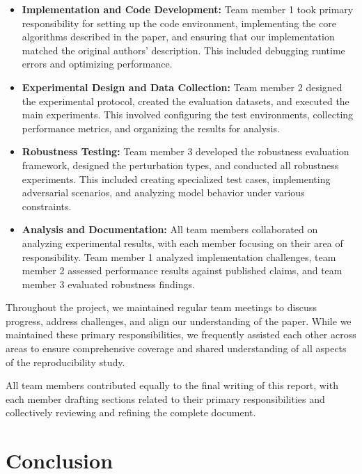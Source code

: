 \documentclass[11pt,a4paper]{article}
\begin{document}
\begin{itemize}
    \item \textbf{Implementation and Code Development:} Team member 1 took primary responsibility for setting up the code environment, implementing the core algorithms described in the paper, and ensuring that our implementation matched the original authors' description. This included debugging runtime errors and optimizing performance.
    
    \item \textbf{Experimental Design and Data Collection:} Team member 2 designed the experimental protocol, created the evaluation datasets, and executed the main experiments. This involved configuring the test environments, collecting performance metrics, and organizing the results for analysis.
    
    \item \textbf{Robustness Testing:} Team member 3 developed the robustness evaluation framework, designed the perturbation types, and conducted all robustness experiments. This included creating specialized test cases, implementing adversarial scenarios, and analyzing model behavior under various constraints.
    
    \item \textbf{Analysis and Documentation:} All team members collaborated on analyzing experimental results, with each member focusing on their area of responsibility. Team member 1 analyzed implementation challenges, team member 2 assessed performance results against published claims, and team member 3 evaluated robustness findings.
\end{itemize}

Throughout the project, we maintained regular team meetings to discuss progress, address challenges, and align our understanding of the paper. While we maintained these primary responsibilities, we frequently assisted each other across areas to ensure comprehensive coverage and shared understanding of all aspects of the reproducibility study.

All team members contributed equally to the final writing of this report, with each member drafting sections related to their primary responsibilities and collectively reviewing and refining the complete document.

\section{Conclusion}
\end{document}
